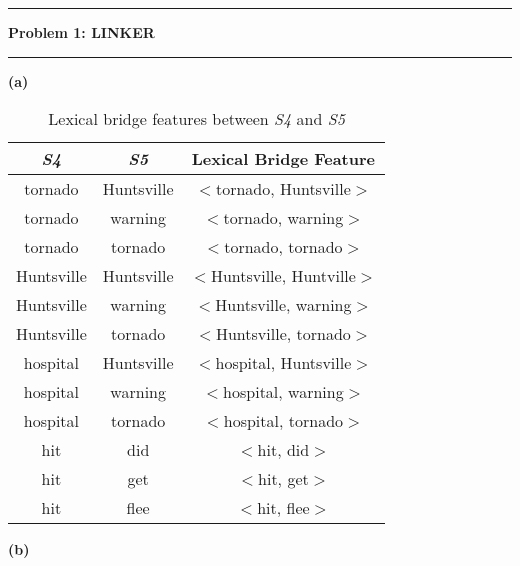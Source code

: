\documentclass[11pt]{article}
\newcommand\question[2]{\vspace{.25in}\hrule\textbf{#1: #2}\vspace{.5em}\hrule\vspace{.10in}}
\renewcommand\part[1]{\vspace{.10in}\textbf{(#1)}}
\begin{document}
\raggedright

\newcommand\NAME{Jake Pitkin}
\newcommand\UID{u0891770}
\newcommand\HWNUM{3}

\question{Problem 1}{LINKER}

\part{a}


 \begin{table}[H]
\centering
{\renewcommand{\arraystretch}{1.2}%
\begin{tabular}{| c | c | c |}
\hline
\textbf{\textit{S4}} & \textbf{\textit{S5}} & \textbf{Lexical Bridge Feature}\\
\hline
tornado & Huntsville & $<$tornado, Huntsville$>$ \\ \hline
tornado & warning & $<$tornado, warning$>$ \\ \hline
tornado & tornado & $<$tornado, tornado$>$ \\ \hline
Huntsville & Huntsville & $<$Huntsville, Huntville$>$ \\ \hline
Huntsville & warning & $<$Huntsville, warning$>$ \\ \hline
Huntsville & tornado & $<$Huntsville, tornado$>$ \\ \hline
hospital & Huntsville & $<$hospital, Huntsville$>$ \\ \hline
hospital & warning & $<$hospital, warning$>$ \\ \hline
hospital & tornado & $<$hospital, tornado$>$ \\ \hline
hit & did & $<$hit, did$>$ \\ \hline
hit & get & $<$hit, get$>$ \\ \hline
hit & flee & $<$hit, flee$>$ \\ \hline
\end{tabular}}
\caption{Lexical bridge features between \textit{S4} and \textit{S5}}
\end{table}

\part{b}
\end{document}
